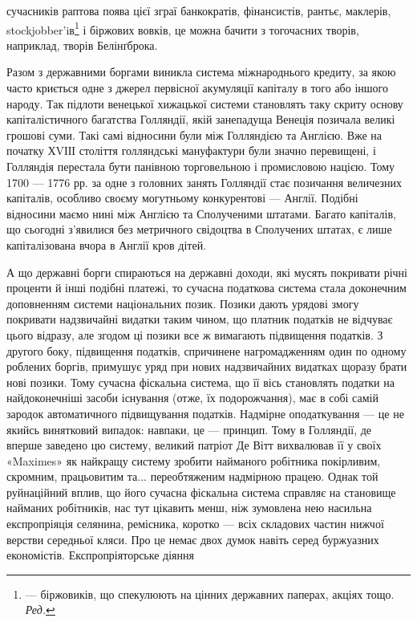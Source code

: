\parcont{}  %
сучасників раптова поява цієї зграї банкократів, фінансистів, рантьє, маклерів, stockjobber’iв\footnote*{
— біржовиків, що спекулюють на цінних державних паперах, акціях тощо. \emph{Ред.}
} і
біржових вовків, це можна бачити з тогочасних творів, наприклад, творів Белінґброка.

Разом з державними боргами виникла система міжнароднього кредиту, за якою часто криється одне з
джерел первісної акумуляції капіталу в того або іншого народу. Так підлоти венецької хижацької
системи становлять таку скриту основу капіталістичного
багатства Голляндії, якій занепадуща Венеція позичала великі грошові суми. Такі самі відносини були
між Голляндією та Англією. Вже на початку ХVІІІ століття голляндські мануфактури були значно
перевищені, і Голляндія перестала бути панівною торговельною і промисловою нацією. Тому 1700 — 1776
рр. за одне з головних занять Голляндії стає позичання величезних капіталів, особливо своєму
могутньому конкурентові — Англії. Подібні відносини маємо нині між Англією та Сполученими
штатами. Багато капіталів, що сьогодні з’явилися без метричного свідоцтва в Сполучених штатах, є
лише капіталізована вчора в Англії кров дітей.

А що державні борги спираються на державні доходи, які мусять покривати річні проценти й інші
подібні платежі, то сучасна податкова система стала доконечним доповненням системи національних
позик. Позики дають урядові змогу покривати
надзвичайні видатки таким чином, що платник податків не відчуває цього відразу, але згодом ці позики
все ж вимагають підвищення податків. З другого боку, підвищення податків, спричинене нагромадженням
один по одному роблених боргів, примушує
уряд при нових надзвичайних видатках щоразу брати нові позики. Тому сучасна фіскальна система, що її
вісь становлять податки на найдоконечніші засоби існування (отже, їх подорожчання), має в собі самій
зародок автоматичного підвищування податків. Надмірне оподаткування — це не якийсь винятковий
випадок: навпаки, це — принцип. Тому в Голляндії, де вперше заведено цю систему, великий патріот Де
Вітт вихвалював її у своїх «Maximes» як найкращу систему зробити найманого робітника покірливим,
скромним, працьовитим та... переобтяженим надмірною працею. Однак той руйнаційний вплив, що його
сучасна фіскальна система справляє на становище найманих робітників, нас тут цікавить менш, ніж
зумовлена нею насильна експропріяція селянина, ремісника, коротко — всіх складових частин нижчої
верстви середньої кляси. Про це немає двох думок навіть серед буржуазних економістів.
Експропріяторське діяння
\parbreak{}  %
